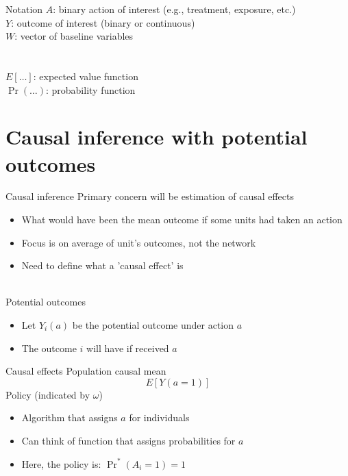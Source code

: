 \documentclass{beamer}
\begin{document}
\begin{frame}{Notation}
	$A$: binary action of interest (e.g., treatment, exposure, etc.)\\
	$Y$: outcome of interest (binary or continuous)\\
	$W$: vector of baseline variables\\~\\~\\
	$E[\dots]$: expected value function\\
	$\Pr(\dots)$: probability function
\end{frame}

\section{Causal inference with potential outcomes}

\begin{frame}{Causal inference}
	Primary concern will be estimation of causal effects
	\begin{itemize}
		\item What would have been the mean outcome if some units had taken an action
		\item Focus is on average of unit's outcomes, not the network
		\item Need to define what a 'causal effect' is
	\end{itemize}~\\
	Potential outcomes
	\begin{itemize}
		\item Let $Y_i(a)$ be the potential outcome under action $a$
		\item The outcome $i$ will have if received $a$
	\end{itemize}
\end{frame}

\begin{frame}{Causal effects}
	Population causal mean
	\[E[Y(a=1)]\]
	Policy (indicated by $\omega$)
	\begin{itemize}
		\item Algorithm that assigns $a$ for individuals
		\item Can think of function that assigns probabilities for $a$
		\item Here, the policy is: $\Pr^*(A_i=1) = 1$
	\end{itemize}
\end{frame}
\end{document}
